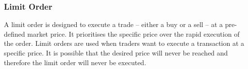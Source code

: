 \subsubsection{Limit Order}
\label{subsub:LimitOrder}
A limit order is designed to execute a trade – either a buy or a sell – at a pre-defined market price. It prioritises the specific price over the rapid execution of the order. Limit orders are used when traders want to execute a transaction at a specific price. It is possible that the desired price will never be reached and therefore the limit order will never be executed.